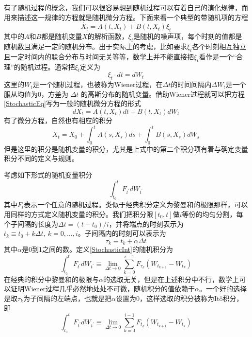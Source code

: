 有了随机过程的概念，我们可以很容易想到随机过程可以有着自己的演化规律，而用来描述这一规律的方程就是随机微分方程。下面来看一个典型的带随机项的方程
\begin{equation}
\dot{X_t}=A(t,X_t)+B(t,X_t)\xi_t
\label{StochasticEq}
\end{equation}
其中的$A$和$B$都是随机变量$X$的解析函数，$\xi_t$是随机的噪声项，每个时刻的值都是随机数且满足一定的随机分布。出于实际上的考虑，比如要求$\xi_t$各个时刻相互独立且一定时间内的联合分布与时间无关等等，数学上并不能直接把$\xi_t$看作是一个“合理”的随机过程。通常把$\xi_t$定义为
\begin{equation}
\xi_t \cdot dt=d W_t
\end{equation}
这里的$W_t$是一个随机过程，也被称为Wiener过程，在$\Delta t$的时间间隔内$\Delta W_t$是一个服从均值为0，方差为 $\Delta t$ 的高斯分布的随机变量\cite{carmichael1999statistical}。借助Wiener过程就可以把方程\eqref{StochasticEq}写为一般的随机微分方程的形式
\begin{equation}
d X_t=A(t,X_t) dt + B(t,X_t) d W_t
\label{StochasticDiff}
\end{equation}
有了微分方程，自然也有相应的积分
\begin{equation}
X_t=X_0 + \int_{0}^{t} A(s,X_s) ds + \int_{0}^{t} B(s,X_s) d W_s
\end{equation}
但是这里的积分是随机变量的积分，尤其是上式中的第二个积分项有着与确定变量积分不同的定义与规则。

考虑如下形式的随机变量积分
\begin{equation}
\int_{t_{0}}^{t} F_{t^{\prime}} d W_{t^{\prime}}
\label{StochasticInt}
\end{equation}
其中$F_{t}$表示一个任意的随机过程。类似于经典积分定义为黎曼和的极限那样，可以用同样的方式定义随机变量的积分。我们把积分限$[t_0,t]$做$i$等份的均匀分割，每个子间隔的长度为$\Delta t=\left(t-t_{0}\right) / i$，并将端点的时刻表示为$t_{k} \equiv t_{0}+k \Delta t,~ k=0, \ldots, i$。子间隔内的时刻可以表示为
\begin{equation}
\tau_{k} \equiv t_{k}+\alpha \Delta t
\end{equation}
其中$\alpha$是0到1之间的数。定义\eqref{StochasticInt}的随机积分为
\begin{equation}
\int_{t_{0}}^{t} F_{t^{\prime}} d W_{t^{\prime}} \equiv \lim\limits_{\Delta t \to 0} \sum_{k=0}^{i-1} F_{\tau_{k}}\left(W_{t_{k+1}}-W_{t_{k}}\right)
\end{equation}
在经典的积分中黎曼和的极限与$\alpha$的选取无关，但是在上述积分中不行，数学上可以证明Wiener过程几乎必然地处处不可微，随机积分的值依赖于$\alpha$。一个好的选择是取$\tau_{k}$为子间隔的左端点，也就是把$\alpha$设置为0，这样选取的积分被称为It\^o积分，即
\begin{equation}
\int_{t_{0}}^{t} F_{t^{\prime}} d W_{t^{\prime}} \equiv \lim\limits_{\Delta t \to 0} \sum_{k=0}^{i-1} F_{t_{k}}\left(W_{t_{k+1}}-W_{t_{k}}\right)
\label{ItoIntegral}
\end{equation}

